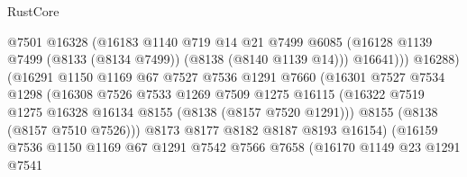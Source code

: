 \begin{lexlean}{RustCore}
\begin{coremodule}
                                  @7501
                                  @16328
                                  (@16183
                                    @1140
                                    @719
                                    @14
                                    @21
                                    @7499
                                    @6085
                                    (@16128
                                      @1139
                                      @7499
                                      (@8133 (@8134 @7499))
                                      (@8138 (@8140 @1139 @14)))
                                    @16641)))
                              @16288)
                            (@16291
                              @1150
                              @1169
                              @67
                              @7527
                              @7536
                              @1291
                              @7660
                              (@16301
                                @7527
                                @7534
                                @1298
                                (@16308
                                  @7526
                                  @7533
                                  @1269
                                  @7509
                                  @1275
                                  @16115
                                  (@16322
                                    @7519
                                    @1275
                                    @16328
                                    @16134
                                    @8155
                                    (@8138 (@8157 @7520 @1291)))
                                  @8155
                                  (@8138 (@8157 @7510 @7526)))
                                @8173
                                @8177
                                @8182
                                @8187
                                @8193
                                @16154)
                              (@16159
                                @7536
                                @1150
                                @1169
                                @67
                                @1291
                                @7542
                                @7566
                                @7658
                                (@16170
                                  @1149
                                  @23
                                  @1291
                                  @7541

\end{coremodule}
\end{lexlean}
